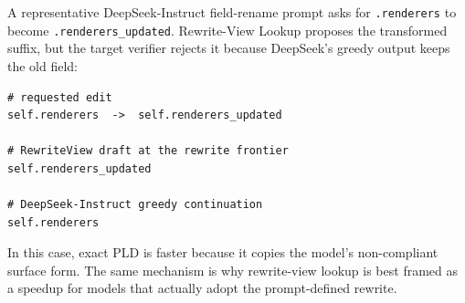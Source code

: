 \documentclass[11pt,a4paper]{article}
\begin{document}
A representative DeepSeek-Instruct field-rename prompt asks for
\texttt{.renderers} to become \texttt{.renderers\_updated}. Rewrite-View Lookup
proposes the transformed suffix, but the target verifier rejects it
because DeepSeek's greedy output keeps the old field:

\begin{lstlisting}[basicstyle=\ttfamily\tiny,frame=single]
# requested edit
self.renderers  ->  self.renderers_updated

# RewriteView draft at the rewrite frontier
self.renderers_updated

# DeepSeek-Instruct greedy continuation
self.renderers
\end{lstlisting}

In this case, exact PLD is faster because it copies the model's
non-compliant surface form. The same mechanism is why rewrite-view
lookup is best framed as a speedup for models that actually adopt the
prompt-defined rewrite.

\begin{table}[h]
\centering\scriptsize
\caption{Instruction-compliance boundary. Ratios are against tuned PLD.
Qwen-base rows use the audited fp32/sdpa exact-path artifact; instruct rows use
existing untemplated bf16/sdpa boundary artifacts. Spearman correlation is per-task
rewrite-compliance vs. VANTAGE/PLD and is marked n/a when compliance is tied
or missing. Zero-drift rows are same-route controls and are not interpreted as
rewrite-view speedups.}
\label{tab:boundary}
\end{table}
\end{document}
